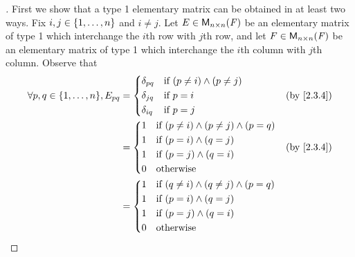 \begin{proof}[]
  First we show that a type 1 elementary matrix can be obtained in at least two ways.
  Fix \(i, j \in \left\lbrace1, \dots, n\right\rbrace\) and \(i \neq j\).
  Let \(E \in \mathsf{M}_{{n} \times n}({\mathit{F}})\) be an elementary matrix of type 1 which interchange the \(i\)th row with \(j\)th row, and let \(F \in \mathsf{M}_{{n} \times n}({\mathit{F}})\) be an elementary matrix of type 1 which interchange the \(i\)th column with \(j\)th column.
  Observe that
  \begin{align*}
    \forall p, q \in \set{1, \dots, n}, E_{p q} & = \begin{dcases}
                                                      \delta_{p q} & \text{if } (p \neq i) \land (p \neq j) \\
                                                      \delta_{j q} & \text{if } p = i                       \\
                                                      \delta_{i q} & \text{if } p = j
                                                    \end{dcases}    &  & \text{(by \cref{2.3.4})}    \\
                                                & = \begin{dcases}
                                                      1 & \text{if } (p \neq i) \land (p \neq j) \land (p = q) \\
                                                      1 & \text{if } (p = i) \land (q = j)                     \\
                                                      1 & \text{if } (p = j) \land (q = i)                     \\
                                                      0 & \text{otherwise}
                                                    \end{dcases} &  & \text{(by \cref{2.3.4})} \\
                                                & = \begin{dcases}
                                                      1 & \text{if } (q \neq i) \land (q \neq j) \land (p = q) \\
                                                      1 & \text{if } (p = i) \land (q = j)                     \\
                                                      1 & \text{if } (p = j) \land (q = i)                     \\
                                                      0 & \text{otherwise}

\end{dcases}
\end{align*}
\end{proof}
